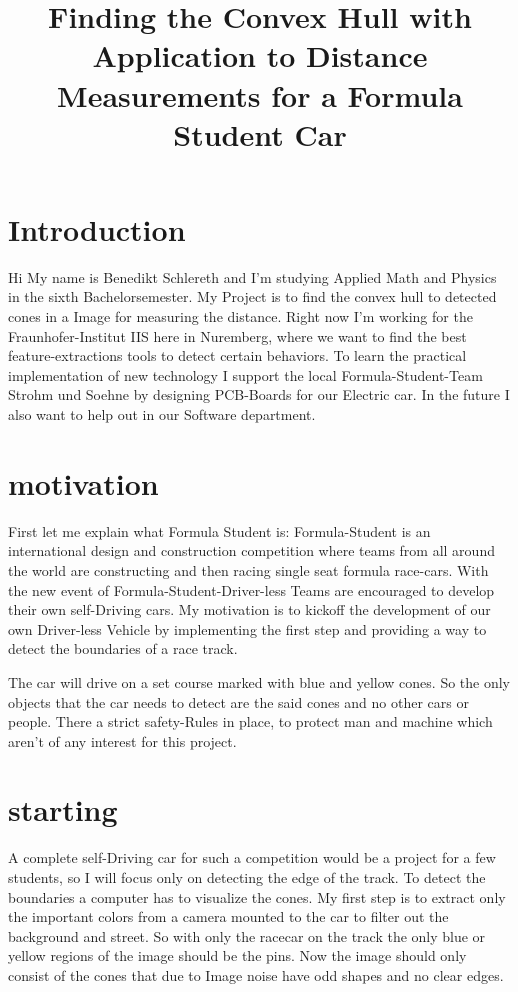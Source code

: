 \documentclass[10pt,a4paper]{article}
\title{Finding the Convex Hull with Application to Distance Measurements for a Formula Student Car}
\begin{document}
	\maketitle
	
	\section{Introduction}
	Hi
	My name is Benedikt Schlereth and I'm studying Applied Math and Physics in the sixth Bachelorsemester. 
	My Project is to find the convex hull to detected cones in a Image for measuring the distance.
	Right now I'm working for the Fraunhofer-Institut IIS here in Nuremberg, where we want to find the best feature-extractions tools to detect certain behaviors.
	To learn the practical implementation of new technology I support the local Formula-Student-Team Strohm und Soehne by designing PCB-Boards for our Electric car.
	In the future I also want to help out in our Software department.
	
	
	\section{motivation}
	First let me explain what Formula Student is:
	Formula-Student is an international design and construction competition where teams from all around the world are constructing and then racing single seat formula race-cars.
	With the new event of Formula-Student-Driver-less Teams are encouraged to develop their own self-Driving cars.
	My motivation is to kickoff the development of our own Driver-less Vehicle by implementing the first step and providing a way to detect the boundaries of a race track. 
	
	The car will drive on a set course marked with blue and yellow cones. So the only objects that the car needs to detect are the said cones and no other cars or people. There a strict safety-Rules in place, to protect man and machine which aren't of any interest for this project. 
	
	\section{starting}
	A complete self-Driving car for such a competition would be a project for a few students, so I will focus only on detecting the edge of the track. 
	To detect the boundaries a computer has to visualize the cones.
	My first step is to extract only the important colors from a camera mounted to the car to filter out the background and street.
	So with only the racecar on the track the only blue or yellow regions of the image should be the pins.
	Now the image should only consist of the cones that due to Image noise have odd shapes and no clear edges. 
	
\end{document}
